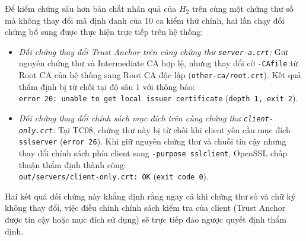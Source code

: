 Để kiểm chứng sâu hơn bản chất nhân quả của $H_2$ trên cùng một chứng thư số mà không thay đổi mã định danh của 10 ca kiểm thử chính, hai lần chạy đối chứng bổ sung được thực hiện trực tiếp trên hệ thống:
\begin{itemize}
    \item \textit{Đối chứng thay đổi Trust Anchor trên cùng chứng thư \texttt{server-a.crt}:} Giữ nguyên chứng thư và Intermediate CA hợp lệ, nhưng thay đổi cờ \texttt{-CAfile} từ Root CA của hệ thống sang Root CA độc lập (\texttt{other-ca/root.crt}). Kết quả thẩm định bị từ chối tại độ sâu 1 với thông báo: \\
    \texttt{error 20: unable to get local issuer certificate} (\texttt{depth 1, exit 2}).
    \item \textit{Đối chứng thay đổi chính sách mục đích trên cùng chứng thư \texttt{client-only.crt}:} Tại TC08, chứng thư này bị từ chối khi client yêu cầu mục đích \texttt{sslserver} (\texttt{error 26}). Khi giữ nguyên chứng thư và chuỗi tin cậy nhưng thay đổi chính sách phía client sang \texttt{-purpose sslclient}, OpenSSL chấp thuận thẩm định thành công: \\
    \texttt{out/servers/client-only.crt: OK} (\texttt{exit code 0}).
\end{itemize}
Hai kết quả đối chứng này khẳng định rằng ngay cả khi chứng thư số và chữ ký không thay đổi, việc điều chỉnh chính sách kiểm tra của client (Trust Anchor được tin cậy hoặc mục đích sử dụng) sẽ trực tiếp đảo ngược quyết định thẩm định.

